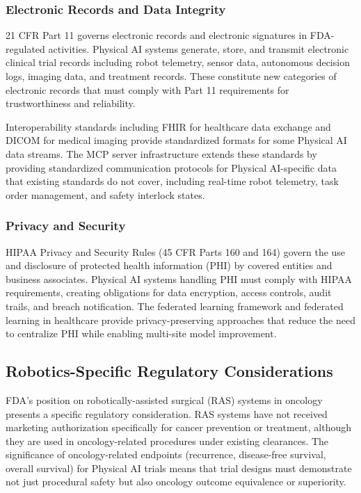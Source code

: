 \subsubsection{Electronic Records and Data Integrity}

21 CFR Part 11 governs electronic records and electronic signatures in
FDA-regulated activities. Physical AI systems generate, store, and transmit
electronic clinical trial records including robot telemetry, sensor data,
autonomous decision logs, imaging data, and treatment records. These constitute
new categories of electronic records that must comply with Part 11 requirements
for trustworthiness and reliability.

Interoperability standards including FHIR \cite{hl7-fhir} for healthcare data
exchange and DICOM \cite{dicom} for medical imaging provide standardized
formats for some Physical AI data streams. The MCP server infrastructure
\cite{national-mcp-paper} extends these standards by providing standardized
communication protocols for Physical AI-specific data that existing standards
do not cover, including real-time robot telemetry, task order management, and
safety interlock states.

\subsubsection{Privacy and Security}

HIPAA Privacy and Security Rules (45 CFR Parts 160 and 164) \cite{hipaa} govern
the use and disclosure of protected health information (PHI) by covered
entities and business associates. Physical AI systems handling PHI must comply
with HIPAA requirements, creating obligations for data encryption, access
controls, audit trails, and breach notification. The federated learning
framework \cite{fl-paper} and federated learning in healthcare
\cite{federated-learning-healthcare} provide privacy-preserving approaches
that reduce the need to centralize PHI while enabling multi-site model
improvement.

\subsection{Robotics-Specific Regulatory Considerations}
\label{subsec:robotics-regulatory}

FDA's position on robotically-assisted surgical (RAS) systems in oncology
presents a specific regulatory consideration. RAS systems have not received
marketing authorization specifically for cancer prevention or treatment,
although they are used in oncology-related procedures under existing
clearances. The significance of oncology-related endpoints (recurrence,
disease-free survival, overall survival) for Physical AI trials means that
trial designs must demonstrate not just procedural safety but also oncology
outcome equivalence or superiority.

